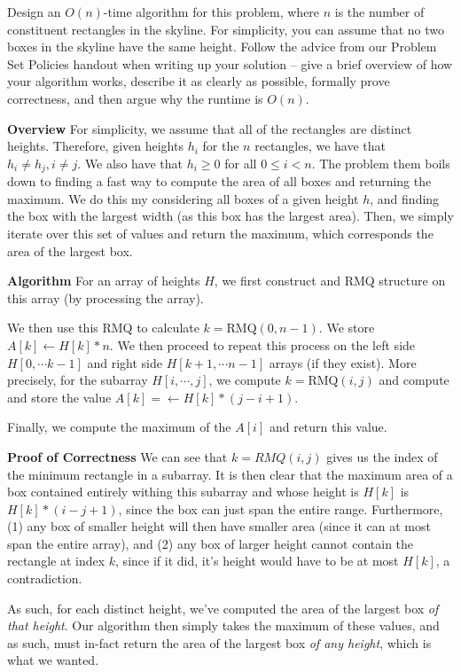 \documentclass[12pt]{exam}
\newcommand*{\bigo}[1]{O \left( #1 \right)}
\begin{document}
\begin{questions}
Design an $\bigo{n}$-time algorithm for this problem, where $n$ is the number of constituent rectangles in the skyline. For simplicity, you can assume that no two boxes in the skyline have the same height. Follow the advice from our Problem Set Policies handout when writing up your solution -- give a brief overview of how your algorithm works, describe it as clearly as possible, formally prove correctness, and then argue why the runtime is $\bigo{n}$.

\begin{solution}
\textbf{Overview}
For simplicity, we assume that all of the rectangles are distinct heights. Therefore, given heights $h_i$ for the $n$ rectangles, we have that $h_i \neq h_j, i \neq j$. We also have that $h_i \geq 0$ for all $0 \leq i < n$. The problem them boils down to finding a fast way to compute the area of all boxes and returning the maximum. We do this my considering all boxes of a given height $h$, and finding the box with the largest width (as this box has the largest area). Then, we simply iterate over this set of values and return the maximum, which corresponds the area of the largest box.

\textbf{Algorithm}
For an array of heights $H$, we first construct and RMQ structure on this array (by processing the array).

We then use this RMQ to calculate $k = \text{RMQ}(0,n-1)$. We store $A[k] \leftarrow H[k] * n$. We then proceed to repeat this process on the left side $H[0, \cdots k -1 ]$ and right side $H[k + 1, \cdots n -1 ]$ arrays (if they exist). More precisely, for the subarray $H[i, \cdots, j]$, we compute $k = \text{RMQ}(i, j)$ and compute and store the value $A[k] = \leftarrow H[k] * (j - i + 1)$. 

Finally, we compute the maximum of the $A[i]$ and return this value.

\textbf{Proof of Correctness}
We can see that $k = RMQ(i, j)$ gives us the index of the minimum rectangle in a subarray. It is then clear that the maximum area of a box contained entirely withing this subarray and whose height is $H[k]$ is $H[k] * (i-j+1)$, since the box can just span the entire range. Furthermore, (1) any box of smaller height will then have smaller area (since it can at most span the entire array), and (2) any box of larger height cannot contain the rectangle at index $k$, since if it did, it's height would have to be at most $H[k]$, a contradiction.

As such, for each distinct height, we've computed the area of the largest box \textit{of that height}. Our algorithm then simply takes the maximum of these values, and as such, must in-fact return the area of the largest box \textit{of any height}, which is what we wanted.


\end{solution}
\end{questions}
\end{document}
